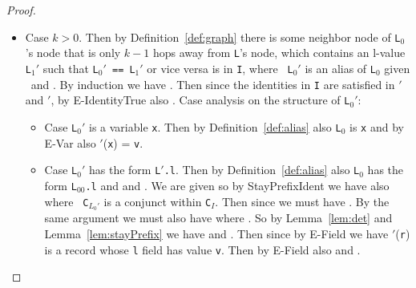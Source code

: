 \begin{proof}
\begin{itemize}
\item Case $k>0$.  Then by Definition~\ref{def:graph} there is some
  neighbor node of {\tt L$_0$}'s node that is only $k-1$ hops away
  from {\tt L}'s node, which contains an l-value {\tt L$_1'$} such
  that {\tt L$_0'$ == L$_1'$} or vice versa is in {\tt I}, where {\tt
    L$_0'$} is an alias of {\tt L$_0$} given \Euid\ and \Huid.  
By induction we have .  Then
since the identities in {\tt I} are satisfied in {\tt \Euid$'$} and
{\tt \Huid$'$}, by {\sc E-IdentityTrue} also
.  Case
analysis on the structure of {\tt L$_0'$}:
  \begin{itemize}

 \item Case {\tt L$_0'$} is a variable {\tt x}.  Then by
  Definition~\ref{def:alias} also
 {\tt L$_0$} is {\tt x} and by  {\sc E-Var} also \Euid$'$({\tt x}) =
  {\tt v}.

  \item Case {\tt L$_0'$} has the form {\tt L$'$.l}.  Then by
    Definition~\ref{def:alias} also {\tt L$_0$} has the
    form {\tt L$_{00}$.l} and 
    and .  
We are given 
 so by {\sc StayPrefixIdent} we
have also  where {\tt
  C$_{L_0'}$} is a conjunct within {\tt C$_I$}.  Then since 
 we must have .  By the
 same argument we must also have
  where .  So by
 Lemma~\ref{lem:det} and Lemma~\ref{lem:stayPrefix} we have 
 and
.  
Then since  by
 {\sc E-Field} we have \Huid$'$({\tt r}) is a record whose {\tt l}
 field has value {\tt v}.  Then by {\sc E-Field} also 
and .


\end{itemize}

\end{itemize}
\end{proof}


